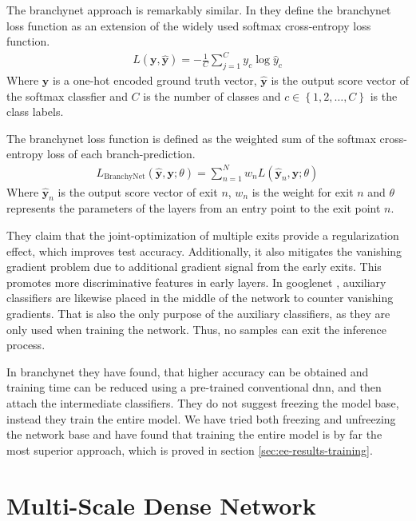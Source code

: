 The \gls{branchynet} approach is remarkably similar. In \cite{teerapittayanon_branchynet:_2016} they define the \gls{branchynet} loss function as an extension of the widely used softmax cross-entropy loss function.
\begin{align}
L\left(\bm{y},\hat{\bm{y}}\right) = - \frac{1}{C} \sum_{j =1}^{C} y_c \log \hat{y}_c
\end{align}
 Where $ \bm{y} $ is a one-hot encoded ground truth vector, $ \bm{\hat{y}} $ is the output score vector of the softmax classfier and $ C $ is the number of classes and $ c \in \left\{1, 2,  \dots, C\right\} $ is the class labels.
	
The \gls{branchynet} loss function is defined as the weighted sum of the softmax cross-entropy loss of each branch-prediction. 
\begin{align}
	L_{\mathrm{BranchyNet}}(\hat{\bm{y}},\bm{y};\theta) = \sum_{n=1}^{N} w_n L \left(\hat{\bm{y}}_{n},\bm{y};\theta\right)
\end{align}
Where $ \bm{\hat{y}}_n $ is the output score vector of exit $ n $, $ w_n $ is the weight for exit $ n $ and $ \theta $ represents the parameters of the layers from an entry point to the exit point $ n $.

They claim that the joint-optimization of multiple exits provide a regularization effect, which improves test accuracy. Additionally, it also mitigates the vanishing gradient problem due to additional gradient signal from the early exits. This promotes more discriminative features in early layers. In \gls{googlenet} \cite{szegedy_going_2015}, auxiliary classifiers are likewise placed in the middle of the network to counter vanishing gradients. That is also the only purpose of the auxiliary classifiers, as they are only used when training the network. Thus, no samples can exit the inference process. 

In \gls{branchynet} they have found, that higher accuracy can be obtained and training time can be reduced using a pre-trained conventional \gls{dnn}, and then attach the intermediate classifiers. They do not suggest freezing the model base, instead they train the entire model. We have tried both freezing and unfreezing the network base and have found that training the entire model is by far the most superior approach, which is proved in section \ref{sec:ee-results-training}.

\section{Multi-Scale Dense Network} \label{sec:ee-msdnet}

